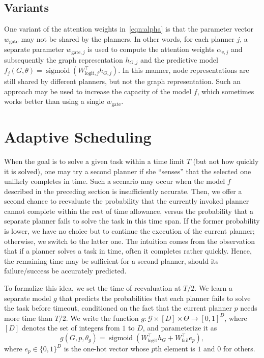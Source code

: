 \documentclass[letterpaper]{article} %
\DeclareMathOperator{\sigmoid}{sigmoid}
\begin{document}
\subsection{Variants}

One variant of the attention weights in~\eqref{eqn:alpha} is that the parameter vector $w_{\text{gate}}$ may not be shared by the planners. In other words, for each planner $j$, a separate parameter $w_{\text{gate},j}$ is used to compute the attention weights $\alpha_{v,j}$ and subsequently the graph representation $h_{G,j}$ and the predictive model $f_j(G,\theta)=\sigmoid(W_{\text{logit},j}^{\top}h_{G,j})$. In this manner, node representations are still shared by different planners, but not the graph representation. Such an approach may be used to increase the capacity of the model $f$, which sometimes works better than using a single $w_{\text{gate}}$.



\section{Adaptive Scheduling}
When the goal is to solve a given task within a time limit $T$ (but not how quickly it is solved), one may try a second planner if she ``senses'' that the selected one unlikely completes in time. Such a scenario may occur when the model $f$ described in the preceding section is insufficiently accurate. Then, we offer a second chance to reevaluate the probability that the currently invoked planner cannot complete within the rest of time allowance, versus the probability that a separate planner fails to solve the task in this time span. If the former probability is lower, we have no choice but to continue the execution of the current planner; otherwise, we switch to the latter one. The intuition comes from the observation that if a planner solves a task in time, often it completes rather quickly. Hence, the remaining time may be sufficient for a second planner, should its failure/success be accurately predicted.

To formalize this idea, we set the time of reevaluation at $T/2$. We learn a separate model $g$ that predicts the probabilities that each planner fails to solve the task before timeout, conditioned on the fact that the current planner $p$ needs more time than $T/2$. We write the function $g:\mathcal{G}\times[D]\times\Theta\to[0,1]^D$, where $[D]$ denotes the set of integers from $1$ to $D$, and parameterize it as
\[
g(G,p,\theta_g)=\sigmoid(W_{\text{logit}}^{\top}h_G+W_{\text{fail}}^{\top}e_p),
\]
where $e_p\in\{0,1\}^D$ is the one-hot vector whose $p$th element is $1$ and $0$ for others.
\end{document}
